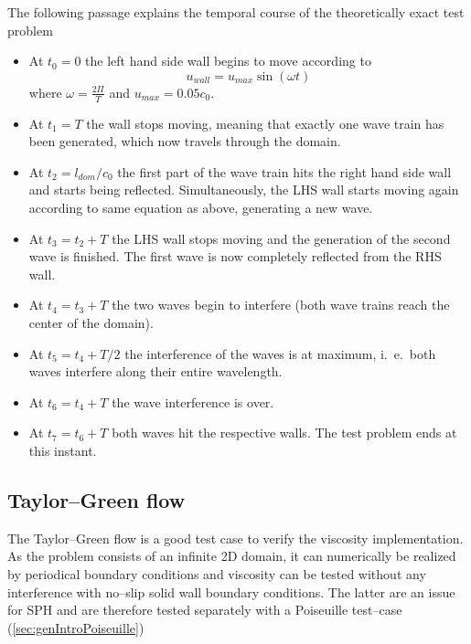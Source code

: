 \documentclass{report}
\begin{document}
The following passage explains the temporal course of the theoretically exact test problem

\begin{itemize} 
\item At $t_0=0$ the left hand side wall begins to move according to 
\begin{equation}
  u_{\mathit{wall}}=u_{\mathit{max}}\sin(\omega t) 
\end{equation}
  where $\omega=\frac{2\Pi}{T}$ and $u_{\mathit{max}}=0.05 c_0$.


\item At $t_1=T$ the wall stops moving, meaning that exactly one wave train has been generated, which now travels through the domain.

\item At $t_2=l_{\mathit{dom}}/c_0$ the first part of the wave train hits the right hand side  wall and starts being reflected. Simultaneously, the LHS wall starts moving again according to same equation as above, generating a new wave.

\item At $t_3=t_2+T$ the LHS wall stops moving and the generation of the second wave is finished. 
The first wave is now completely reflected from the RHS wall.

\item At $t_4=t_3+T$ the two waves begin to interfere (both wave trains reach the center of the domain).

\item At $t_5=t_4+T/2$ the interference of the waves is at maximum, i.\ e.\ both waves interfere along their entire wavelength.

\item At $t_6=t_4+T$ the wave interference is over.

\item At $t_7=t_6+T$ both waves hit the respective walls. The test problem ends at this instant.
\end{itemize}



\subsection{Taylor--Green flow}
The Taylor--Green flow is a good test case to verify the viscosity implementation. As the problem consists of an infinite 2D domain, it can numerically be realized by periodical boundary conditions and viscosity can be tested without any interference with no--slip solid wall boundary conditions. The latter are an issue for SPH and are therefore tested separately with a Poiseuille test--case (\ref{sec:genIntroPoiseuille})
\end{document}

